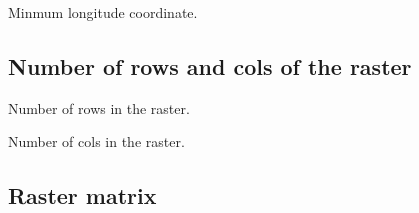\documentclass[letterpaper,10pt,english]{sphinxmanual}
\begin{document}

\begin{fulllineitems}
\label{\detokenize{usage:tocdata.TOCData.minLon}}
\pysigstartsignatures
{}
\pysigstopsignatures
\sphinxAtStartPar
Minmum longitude coordinate.

\end{fulllineitems}



\subsection{Number of rows and cols of the raster}
\label{\detokenize{usage:number-of-rows-and-cols-of-the-raster}}

\begin{fulllineitems}
\label{\detokenize{usage:tocdata.TOCData.nrow}}
\pysigstartsignatures
{}
\pysigstopsignatures
\sphinxAtStartPar
Number of rows in the raster.

\end{fulllineitems}


\begin{fulllineitems}
\label{\detokenize{usage:tocdata.TOCData.ncol}}
\pysigstartsignatures
{}
\pysigstopsignatures
\sphinxAtStartPar
Number of cols in the raster.

\end{fulllineitems}



\subsection{Raster matrix}
\label{\detokenize{usage:raster-matrix}}
\end{document}
